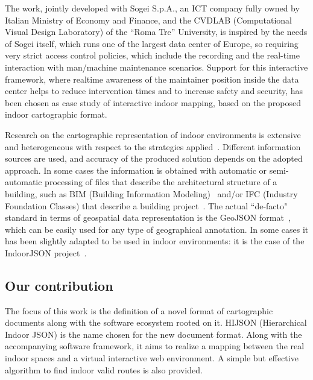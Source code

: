 \documentclass[]{egpubl}
\begin{document}
The work, jointly developed with Sogei S.p.A., an ICT company fully owned by Italian Ministry of Economy and Finance, and the CVDLAB (Computational Visual Design Laboratory) of the ``Roma Tre'' University, is inspired by the needs of Sogei itself, which runs one of the largest data center of Europe, so requiring very strict access control policies, which include the recording and the real-time interaction with man/machine maintenance scenarios. Support for this interactive framework, where realtime awareness of the maintainer position inside the data center helps to reduce intervention times and to increase safety and security, has been chosen as case study of interactive indoor mapping, based on the proposed indoor cartographic format.

Research on the cartographic representation of indoor environments is
extensive and heterogeneous with respect to the strategies
applied~\cite{6418876}. Different information sources are used, and accuracy
of the produced solution depends on the adopted approach. In some cases the
information is obtained with automatic or semi-automatic processing of files
that describe the architectural structure of a building, such as BIM (Building
Information Modeling)~\cite{Eastman:2008:BHG:1796500} and/or IFC (Industry
Foundation Classes) that describe a building project~\cite{6816739}.  The actual ``de-facto" 
standard in terms of geospatial data representation is the GeoJSON
format~\cite{geojson:2008}, which can be easily used for any type of geographical annotation. In
some cases it has been slightly adapted to be used in indoor environments: it
is the case of the IndoorJSON project~\cite{indoorjson:2013}.



\subsection{Our contribution}

The focus of this work is the definition of a novel format of cartographic
documents along with the software ecosystem rooted on it. HIJSON (Hierarchical
Indoor JSON) is the name chosen for the new document format. Along with the
accompanying software framework, it aims to realize a mapping between the real
indoor spaces and a virtual interactive web environment. A simple but
effective algorithm to find indoor valid routes is also provided.
\end{document}
